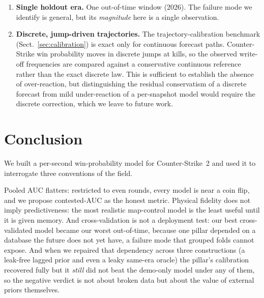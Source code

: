 \documentclass[11pt,a4paper]{article}
\begin{document}
\begin{enumerate}
    they ingest every feature column, they inherit the firepower penalty and cannot be run in a
    ``no-firepower'' configuration without retraining on a reduced column set, which we did not do. A
    deep model restricted to the demo-derived pillars might close the small gap to EB2; we leave that
    to future work.
  \item \textbf{Single holdout era.} One out-of-time window (2026). The failure mode we identify is
    general, but its \emph{magnitude} here is a single observation.
  \item \textbf{Discrete, jump-driven trajectories.} The trajectory-calibration benchmark
    (Sect.~\ref{sec:calibration}) is exact only for continuous forecast paths. Counter-Strike win
    probability moves in discrete jumps at kills, so the observed write-off frequencies are compared
    against a conservative continuous reference rather than the exact discrete law. This is sufficient
    to establish the absence of over-reaction, but distinguishing the residual conservatism of a
    discrete forecast from mild under-reaction of a per-snapshot model would require the discrete
    correction, which we leave to future work.
\end{enumerate}

\section{Conclusion}
\label{sec:conclusion}

We built a per-second win-probability model for Counter-Strike~2 and used it to interrogate three
conventions of the field.

Pooled AUC flatters: restricted to even rounds, every model is near a coin flip, and we propose
contested-AUC as the honest metric. Physical fidelity does not imply predictiveness: the most
realistic map-control model is the least useful until it is given memory. And cross-validation is
not a deployment test: our best cross-validated model became our worst out-of-time, because one
pillar depended on a database the future does not yet have, a failure mode that grouped folds
cannot expose. And when we repaired that dependency across three constructions (a leak-free lagged
prior and even a leaky same-era oracle) the pillar's calibration recovered fully but it \emph{still}
did not beat the demo-only model under any of them, so the negative verdict is not about broken data
but about the value of external priors themselves.
\end{document}
